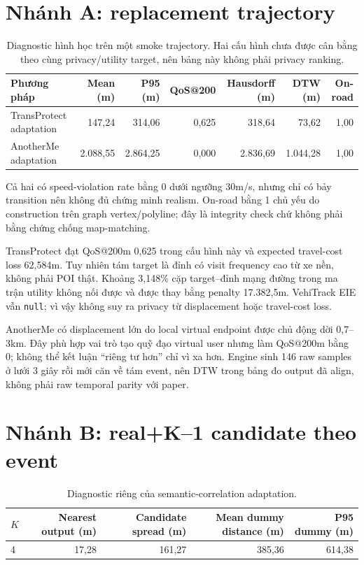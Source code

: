 \documentclass[12pt,a4paper,oneside]{report}
\begin{document}
\section{Nhánh A: replacement trajectory}

\begin{table}[htbp]
\centering
\footnotesize
\caption[Diagnostic hình học cho hai replacement comparator]{Diagnostic hình học trên một smoke trajectory. Hai cấu hình chưa được cân bằng theo cùng privacy/utility target, nên bảng này không phải privacy ranking.}
\label{tab:replacement-results}
\begin{tabular}{lrrrrrr}
\toprule
Phương pháp & Mean (m) & P95 (m) & QoS@200 & Hausdorff (m) & DTW (m) & On-road \\
\midrule
TransProtect adaptation & 147,24 & 314,06 & 0,625 & 318,64 & 73,62 & 1,00 \\
AnotherMe adaptation & 2.088,55 & 2.864,25 & 0,000 & 2.836,69 & 1.044,28 & 1,00 \\
\bottomrule
\end{tabular}
\end{table}

Cả hai có speed-violation rate bằng 0 dưới ngưỡng 30m/s, nhưng chỉ có bảy transition nên không đủ chứng minh realism. On-road bằng 1 chủ yếu do construction trên graph vertex/polyline; đây là integrity check chứ không phải bằng chứng chống map-matching.

TransProtect đạt QoS@200m 0,625 trong cấu hình này và expected travel-cost loss 62,584m. Tuy nhiên tám target là đỉnh có visit frequency cao từ xe nền, không phải POI thật. Khoảng 3,148\% cặp target--đỉnh mạng đường trong ma trận utility không nối được và được thay bằng penalty 17.382,5m. VehiTrack EIE vẫn \texttt{null}; vì vậy không suy ra privacy từ displacement hoặc travel-cost loss.

AnotherMe có displacement lớn do local virtual endpoint được chủ động dời 0,7--3km. Đây phù hợp vai trò tạo quỹ đạo virtual user nhưng làm QoS@200m bằng 0; không thể kết luận ``riêng tư hơn'' chỉ vì xa hơn. Engine sinh 146 raw samples ở lưới 3 giây rồi mới căn về tám event, nên DTW trong bảng đo output đã align, không phải raw temporal parity với paper.

\section{Nhánh B: real+K--1 candidate theo event}

\begin{table}[htbp]
\centering
\small
\caption{Diagnostic riêng của semantic-correlation adaptation.}
\label{tab:semantic-results}
\begin{tabular}{lrrrr}
\toprule
$K$ & Nearest output (m) & Candidate spread (m) & Mean dummy distance (m) & P95 dummy (m) \\
\midrule
4 & 17,28 & 161,27 & 385,36 & 614,38 \\
\bottomrule
\end{tabular}
\end{table}
\end{document}
